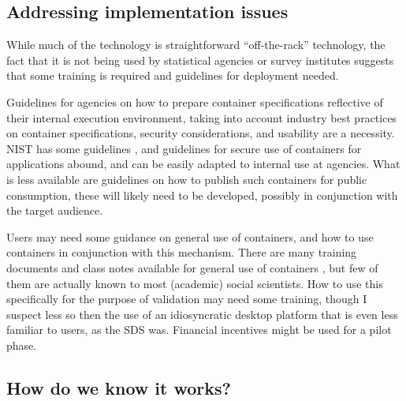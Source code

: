 \documentclass[inline]{hdsr}
\begin{document}
\subsection{Addressing implementation issues}

While much of the technology is straightforward ``off-the-rack'' technology, the fact that it is not being used by statistical agencies or survey institutes suggests that some training is required and guidelines for deployment needed. 
%
\begin{enumerate*}[label={(\arabic*)}, itemjoin={{ }}]
\item Guidelines for agencies on how to prepare container specifications reflective of their internal execution environment, taking into account industry best practices on container specifications, security considerations, and usability are a necessity. NIST has some guidelines \citep{souppaya_application_2017}, and guidelines for secure use of containers for applications abound, and can be easily adapted to internal use at agencies. What is less available are guidelines on how to publish such containers for public consumption, these will likely need to be developed, possibly in conjunction with the target audience.

\item Users may need some guidance on general use of containers, and how to use containers in conjunction with this mechanism. There are many training documents and class notes available for general use of containers \citep{boettiger_introduction_2015,nust_automatically_2017,mcdermott_data_2023,the_turing_way_community_containers_2024,eyers_reproducible_2020,docker-stata,aea_data_editor_use_2021}, but few of them are actually known to most (academic) social scientists. How to use this specifically for the purpose of validation may need some training, though I suspect less so then the use of an idiosyncratic desktop platform that is even less familiar to users, as the \ac{SDS} was. Financial incentives might be used for a pilot phase.  
\end{enumerate*}

\subsection{How do we know it works?}
\end{document}
